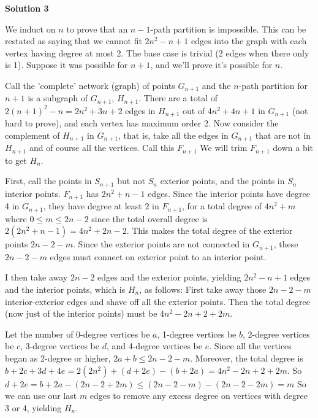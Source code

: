 \begin{enumerate}
 



\textbf{Solution 3}

We induct on $n$ to prove that an $n - 1$-path partition is impossible. This can be restated as saying that we cannot fit $2n^2 - n + 1$ edges into the graph with each vertex having degree at most 2. The base case is trivial (2 edges when there only is 1). Suppose it was possible for $n + 1$, and we'll prove it's possible for $n$.

 Call the 'complete' network (graph) of points $G_{n + 1}$ and the $n$-path partition for $n + 1$ is a subgraph of $G_{n + 1}$, $H_{n + 1}$. There are a total of $2(n + 1)^2 - n = 2n^2 + 3n + 2$ edges in $H_{n + 1}$ out of $4n^2 + 4n + 1$ in $G_{n + 1}$ (not hard to prove), and each vertex has maximum order 2. Now consider the complement of $H_{n + 1}$ in $G_{n + 1}$, that is, take all the edges in $G_{n + 1}$ that are not in $H_{n + 1}$ and of course all the vertices. Call this $F_{n + 1}$ We will trim $F_{n + 1}$ down a bit to get $H_n$.

 First, call the points in $S_{n + 1}$ but not $S_n$ exterior points, and the points in $S_n$ interior points. $F_{n + 1}$ has $2n^2 + n - 1$ edges. Since the interior points have degree 4 in $G_{n + 1}$, they have degree at least 2 in $F_{n + 1}$, for a total degree of $4n^2 + m$ where $0\le m\le 2n - 2$ since the total overall degree is $2(2n^2 + n - 1) = 4n^2 + 2n - 2$. This makes the total degree of the exterior points $2n - 2 - m$. Since the exterior points are not connected in $G_{n + 1}$, these $2n - 2 - m$ edges must connect on exterior point to an interior point.

 I then take away $2n - 2$ edges and the exterior points, yielding $2n^2 - n + 1$ edges and the interior points, which is $H_n$, as follows: First take away those $2n - 2 - m$ interior-exterior edges and shave off all the exterior points. Then the total degree (now just of the interior points) must be $4n^2 - 2n + 2 + 2m$.

 Let the number of 0-degree vertices be $a$, 1-degree vertices be $b$, 2-degree vertices be $c$, 3-degree vertices be $d$, and 4-degree vertices be $e$. Since all the vertices began as 2-degree or higher, $2a + b\le2n - 2 - m$. Moreover, the total degree is $b + 2c + 3d + 4e = 2(2n^2) + (d + 2e) - (b + 2a) = 4n^2 - 2n + 2 + 2m$. So $d + 2e = b + 2a - (2n - 2 + 2m)\le (2n - 2 - m) - (2n - 2 - 2m) = m$ So we can use our last $m$ edges to remove any excess degree on vertices with degree 3 or 4, yielding $H_n$.


\end{enumerate}
